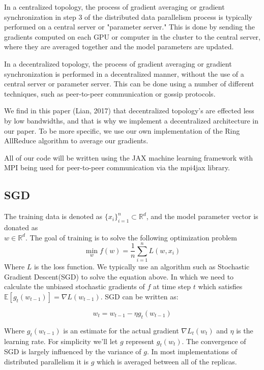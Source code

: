 \documentclass[11pt]{article}
\begin{document}
In a centralized topology, the process of gradient averaging or gradient synchronization in step 3 of the distributed data parallelism process is typically performed on a central server or "parameter server." This is done by sending the gradients computed on each GPU or computer in the cluster to the central server, where they are averaged together and the model parameters are updated.

In a decentralized topology, the process of gradient averaging or gradient synchronization is performed in a decentralized manner, without the use of a central server or parameter server. This can be done using a number of different techniques, such as peer-to-peer communication or gossip protocols.

We find in this paper (Lian, 2017)\cite{lian2017can} that decentralized topology's are effected less by low bandwidths, and that is why we implement a decentralized architecture in our paper. To be more specific, we use our own implementation of the Ring AllReduce algorithm \cite{gibiansky2017bringing} to average our gradients. 

All of our code will be written using the JAX \cite{jax2018github} machine learning framework with MPI being used for peer-to-peer communication via the mpi4jax \cite{mpi4jax} library.

\subsection{SGD}

The training data is denoted as $\{x_i\}^n_{i=1} \subset \mathbb{R}^d$, and the model parameter vector is donated as\\ $w \in \mathbb{R}^d$. The goal of training is to solve the following optimization problem 
$$
\min_w f
(w) = \frac{1}{n} \sum^n_{i=1}L(w,x_i)
$$
Where $L$ is the loss function. We typically use an algorithm such as Stochastic Gradient Descent(SGD) to solve the equation above. In which we need to calculate the unbiased stochastic gradients of $f$ at time step $t$ which satisfies $\mathbb{E}[g_t(w_{t-1})] = {\nabla} L(w_{t-1})$. SGD can be written as:

$$
w_{t} = w_{t-1} - \eta g_t(w_{t-1})
$$

Where $g_t(w_{t-1})$ is an estimate for the actual gradient ${\nabla} L_t(w_t)$ and $\eta$ is the learning rate. For simplicity we'll let $g$ represent $g_t(w_t)$. The convergence of SGD is largely influenced by the variance of $g$. In most implementations of distributed parallelism it is $g$ which is averaged between all of the replicas.
\end{document}

